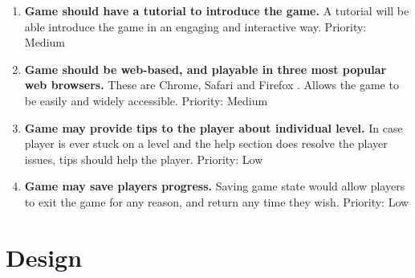 \documentclass[a4paper,11.5pt]{report}
\numberwithin{figure}{section}
\numberwithin{table}{section}
\numberwithin{equation}{section}
\numberwithin{equation}{section}
\newcommand\blankpage{%
    \null
    \thispagestyle{empty}%
    \addtocounter{page}{-1}%
    \newpage}
\begin{document}
\begin{enumerate}[label=3.2.\arabic*]
  \item \textbf{Game should have a tutorial to introduce the game.} A tutorial will be able introduce the game in an engaging and interactive way. \newline Priority: Medium
  
  \item \textbf{Game should be web-based, and playable in three most popular web browsers.} These are Chrome, Safari and Firefox \citep{statistabrowser}. Allows the game to be easily and widely accessible. \newline Priority: Medium
  
  \item \textbf{Game may provide tips to the player about individual level.} In case player is ever stuck on a level and the help section does resolve the player issues, tips should help the player. \newline Priority: Low 
  
  \item \textbf{Game may save players progress.} Saving game state would allow players to exit the game for any reason, and return any time they wish. \newline Priority: Low
  
\end{enumerate}


\afterpage{\blankpage}






\chapter{Design}

\end{document}

